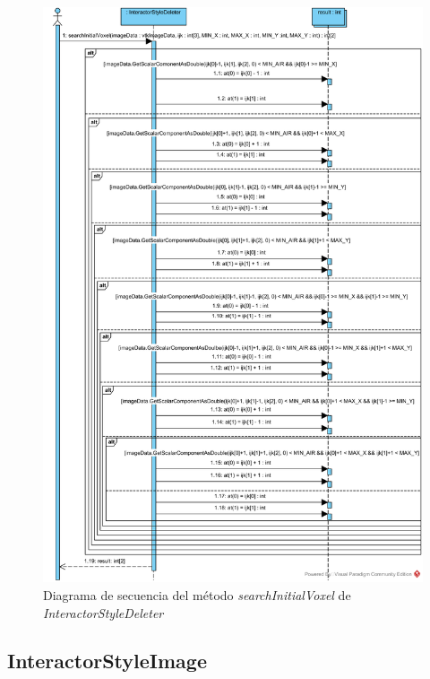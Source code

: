 \begin{figure}[H]
	\centering
	\includegraphics[width=12cm]{imagenes/diagramas/secuencia/InteractorStyleDeleter_SearchInitialVoxel}
	\caption{Diagrama de secuencia del método \textit{searchInitialVoxel} de \textit{InteractorStyleDeleter}}
	\label{fig:diagrama_secuencia_interactorstyledeleter_searchinitialvoxel}
\end{figure}

\subsection{InteractorStyleImage}

